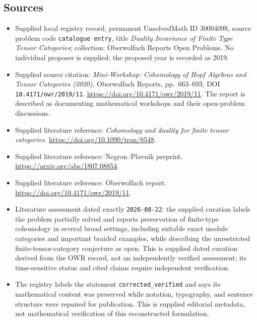 \documentclass[11pt]{article}
\begin{document}
\subsection{Sources}
\begin{itemize}
\item Supplied local registry record, permanent UnsolvedMath ID \(30004098\), source problem code \texttt{catalogue entry}, title \emph{Duality Invariance of Finite Type Tensor Categories}; collection: Oberwolfach Reports Open Problems. No individual proposer is supplied; the proposed year is recorded as 2019.
\item Supplied source citation: \emph{Mini-Workshop: Cohomology of Hopf Algebras and Tensor Categories (2020)}, Oberwolfach Reports, pp.\ 663--693, DOI \texttt{10.4171/owr/2019/11}. \url{https://doi.org/10.4171/owr/2019/11}. The report is described as documenting mathematical workshops and their open-problem discussions.
\item Supplied literature reference: \emph{Cohomology and duality for finite tensor categories}. \url{https://doi.org/10.1090/tran/8548}.
\item Supplied literature reference: Negron--Plavnik preprint. \url{https://arxiv.org/abs/1807.08854}.
\item Supplied literature reference: Oberwolfach report. \url{https://doi.org/10.4171/owr/2019/11}.
\item Literature assessment dated exactly \texttt{2026-08-22}: the supplied curation labels the problem partially solved and reports preservation of finite-type cohomology in several broad settings, including suitable exact module categories and important braided examples, while describing the unrestricted finite-tensor-category conjecture as open. This is supplied dated curation derived from the OWR record, not an independently verified assessment; its time-sensitive status and cited claims require independent verification.
\item The registry labels the statement \texttt{corrected\_verified} and says its mathematical content was preserved while notation, typography, and sentence structure were repaired for publication. This is supplied editorial metadata, not mathematical verification of this reconstructed formulation.
\end{itemize}
\end{document}
